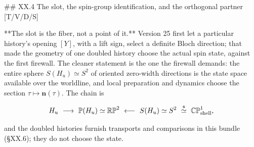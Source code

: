 ## XX.4 The slot, the spin-group identification, and the orthogonal partner [T/V/D/S]

**The slot is the fiber, not a point of it.** Version 25 first let a particular history's opening $[Y]$, with a lift sign, select a definite Bloch direction; that made the geometry of one doubled history choose the actual spin state, against the first firewall. The cleaner statement is the one the firewall demands: the entire sphere $S(H_u)\simeq S^2$ of oriented zero-width directions is the state space available over the worldline, and local preparation and dynamics choose the section $\tau\mapsto\mathbf n(\tau)$. The chain is

$$H_u\ \longrightarrow\ \mathbb P(H_u)\simeq\mathbb{RP}^2\ \longleftarrow\ S(H_u)\simeq S^2\ \overset{\mathfrak s}{\simeq}\ \mathbb{CP}^1_{\rm shell},$$

and the doubled histories furnish transports and comparisons in this bundle (§XX.6); they do not choose the state.

